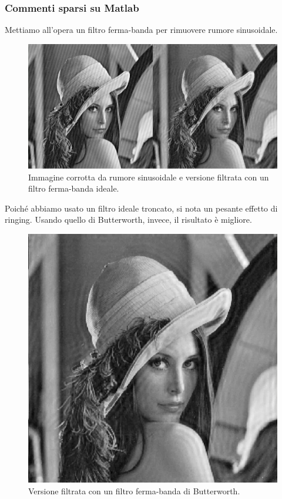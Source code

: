 \documentclass[a4paper,11pt]{article}
\begin{document}
\subsubsection{Commenti sparsi su Matlab}
Mettiamo all'opera un filtro ferma-banda per rimuovere rumore sinusoidale.

\renewcommand{\thefigure}{8.5}
\begin{figure}[!h]
  \centering
    \includegraphics[scale=0.35]{images/8/lena_with_sin_noise_and_ideal_filtering.png}
    \caption{Immagine corrotta da rumore sinusoidale e versione filtrata con un filtro ferma-banda ideale.}
\end{figure}

Poiché abbiamo usato un filtro ideale troncato, si nota un pesante effetto di ringing.
Usando quello di Butterworth, invece, il risultato è migliore.

\newpage
\renewcommand{\thefigure}{8.6}
\begin{figure}[!h]
  \centering
    \includegraphics[scale=0.35]{images/8/lena_butterworth.png}
    \caption{Versione filtrata con un filtro ferma-banda di Butterworth.}
\end{figure}
\end{document}
